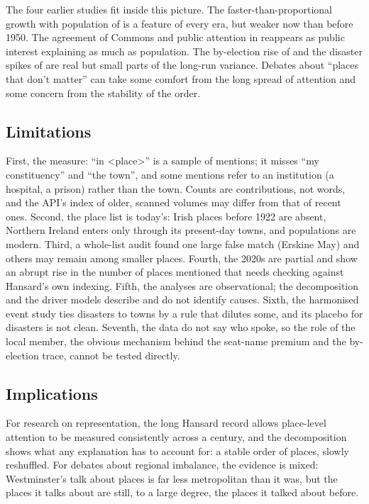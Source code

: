 \documentclass[11pt,a4paper]{article}
\begin{document}
The four earlier studies fit inside this picture. The faster-than-proportional growth with population of \citet{hotham2026a} is a feature of every era, but weaker now than before 1950. The agreement of Commons and public attention in \citet{hotham2026b} reappears as public interest explaining as much as population. The by-election rise of \citet{hotham2026c} and the disaster spikes of \citet{hotham2026d} are real but small parts of the long-run variance. Debates about ``places that don't matter'' \citep{rodriguezpose2018} can take some comfort from the long spread of attention and some concern from the stability of the order.

\subsection{Limitations}
First, the measure: ``in <place>'' is a sample of mentions; it misses ``my constituency'' and ``the town'', and some mentions refer to an institution (a hospital, a prison) rather than the town. Counts are contributions, not words, and the API's index of older, scanned volumes may differ from that of recent ones. Second, the place list is today's: Irish places before 1922 are absent, Northern Ireland enters only through its present-day towns, and populations are modern. Third, a whole-list audit found one large false match (Erskine May) and others may remain among smaller places. Fourth, the 2020s are partial and show an abrupt rise in the number of places mentioned that needs checking against Hansard's own indexing. Fifth, the analyses are observational; the decomposition and the driver models describe and do not identify causes. Sixth, the harmonised event study ties disasters to towns by a rule that dilutes some, and its placebo for disasters is not clean. Seventh, the data do not say who spoke, so the role of the local member, the obvious mechanism behind the seat-name premium and the by-election trace, cannot be tested directly.

\subsection{Implications}
For research on representation, the long Hansard record allows place-level attention to be measured consistently across a century, and the decomposition shows what any explanation has to account for: a stable order of places, slowly reshuffled. For debates about regional imbalance, the evidence is mixed: Westminster's talk about places is far less metropolitan than it was, but the places it talks about are still, to a large degree, the places it talked about before.
\end{document}
